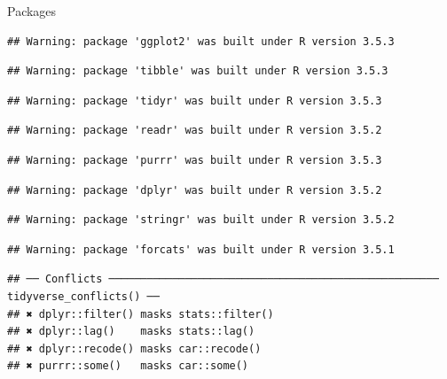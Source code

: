 \documentclass[ignorenonframetext,]{beamer}
\begin{document}
\begin{frame}[fragile]{Packages}
\begin{verbatim}
## Warning: package 'ggplot2' was built under R version 3.5.3
\end{verbatim}

\begin{verbatim}
## Warning: package 'tibble' was built under R version 3.5.3
\end{verbatim}

\begin{verbatim}
## Warning: package 'tidyr' was built under R version 3.5.3
\end{verbatim}

\begin{verbatim}
## Warning: package 'readr' was built under R version 3.5.2
\end{verbatim}

\begin{verbatim}
## Warning: package 'purrr' was built under R version 3.5.3
\end{verbatim}

\begin{verbatim}
## Warning: package 'dplyr' was built under R version 3.5.2
\end{verbatim}

\begin{verbatim}
## Warning: package 'stringr' was built under R version 3.5.2
\end{verbatim}

\begin{verbatim}
## Warning: package 'forcats' was built under R version 3.5.1
\end{verbatim}

\begin{verbatim}
## ── Conflicts ──────────────────────────────────────────────────── tidyverse_conflicts() ──
## ✖ dplyr::filter() masks stats::filter()
## ✖ dplyr::lag()    masks stats::lag()
## ✖ dplyr::recode() masks car::recode()
## ✖ purrr::some()   masks car::some()
\end{verbatim}

\end{frame}
\end{document}
